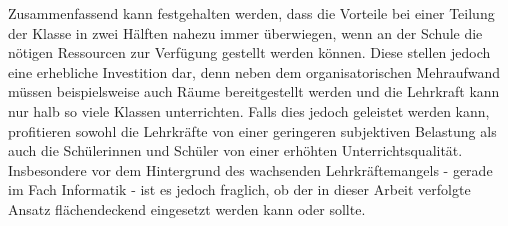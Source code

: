 Zusammenfassend kann festgehalten werden, dass die Vorteile bei einer Teilung der Klasse in zwei Hälften nahezu immer überwiegen, wenn an der Schule die nötigen Ressourcen zur Verfügung gestellt werden können.
Diese stellen jedoch eine erhebliche Investition dar, denn neben dem organisatorischen Mehraufwand müssen beispielsweise auch Räume bereitgestellt werden und die Lehrkraft kann nur halb so viele Klassen unterrichten.
Falls dies jedoch geleistet werden kann, profitieren sowohl die Lehrkräfte von einer geringeren subjektiven Belastung als auch die Schülerinnen und Schüler von einer erhöhten Unterrichtsqualität.
Insbesondere vor dem Hintergrund des wachsenden Lehrkräftemangels - gerade im Fach Informatik - ist es jedoch fraglich, ob der in dieser Arbeit verfolgte Ansatz flächendeckend eingesetzt werden kann oder sollte.